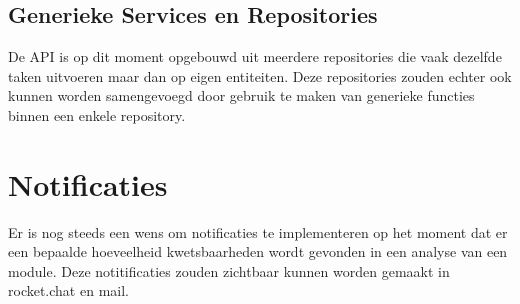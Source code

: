 \subsection{Generieke Services en Repositories}\label{subsec:generieke-services-en-repositories}
De API is op dit moment opgebouwd uit meerdere repositories die vaak dezelfde taken uitvoeren maar dan op eigen entiteiten. Deze repositories zouden echter ook kunnen worden samengevoegd door gebruik te maken van generieke functies binnen een enkele repository.

\section{Notificaties}\label{sec:notificaties}
Er is nog steeds een wens om notificaties te implementeren op het moment dat er een bepaalde hoeveelheid kwetsbaarheden wordt gevonden in een analyse van een module. Deze notitificaties zouden zichtbaar kunnen worden gemaakt in rocket.chat en mail.


